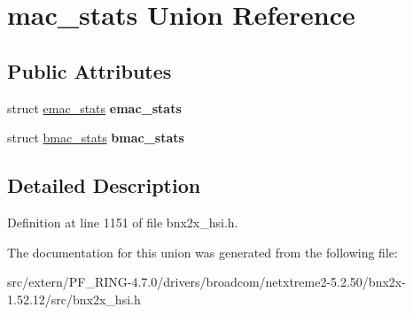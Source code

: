 \hypertarget{unionmac__stats}{
\section{mac\_\-stats Union Reference}
\label{unionmac__stats}
}
\subsection*{Public Attributes}
\begin{DoxyCompactItemize}
\item 
\hypertarget{unionmac__stats_acec5232dd45bcf8c63dae581a1601bdd}{
struct \hyperlink{structemac__stats}{emac\_\-stats} {\bfseries emac\_\-stats}}
\label{unionmac__stats_acec5232dd45bcf8c63dae581a1601bdd}

\item 
\hypertarget{unionmac__stats_abd7cd8450684ba48f52659b2ea2444cb}{
struct \hyperlink{structbmac__stats}{bmac\_\-stats} {\bfseries bmac\_\-stats}}
\label{unionmac__stats_abd7cd8450684ba48f52659b2ea2444cb}

\end{DoxyCompactItemize}


\subsection{Detailed Description}


Definition at line 1151 of file bnx2x\_\-hsi.h.



The documentation for this union was generated from the following file:\begin{DoxyCompactItemize}
\item 
src/extern/PF\_\-RING-\/4.7.0/drivers/broadcom/netxtreme2-\/5.2.50/bnx2x-\/1.52.12/src/bnx2x\_\-hsi.h\end{DoxyCompactItemize}
